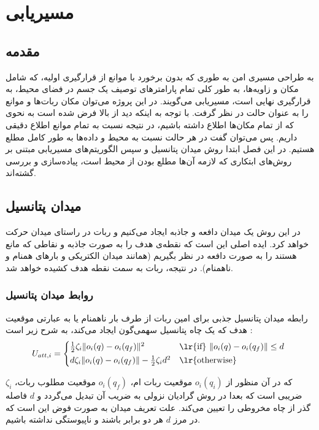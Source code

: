 \chapter{مسیریابی}\label{ch path planning}

\section{مقدمه}

به طراحی مسیری امن به طوری که بدون برخورد با موانع از قرارگیری اولیه، که شامل مکان و زاویه‌ها، به طور کلی تمام پارامترهای توصیف یک جسم در فضای محیط، به قرارگیری نهایی است، مسیریابی می‌گویند. در این پروژه می‌توان مکان ربات‌ها و موانع را به عنوان حالت در نظر گرفت. با توجه به اینکه دید از بالا فرض شده است به نحوی که از تمام مکان‌ها اطلاع داشته باشیم، در نتیجه نسبت به تمام موانع اطلاع دقیقی داریم. پس می‌توان گفت در هر حالت نسبت به محیط و داده‌ها به طور کامل مطلع هستیم. در این فصل ابتدا روش میدان پتانسیل و سپس الگوریتم‌های مسیریابی مبتنی بر روش‌های ابتکاری که لازمه آن‌ها مطلع بودن از محیط است، پیاده‌سازی و بررسی گشته‌اند.

\section{میدان پتانسیل}
در این روش یک میدان دافعه و جاذبه ایجاد می‌کنیم و ربات در راستای میدان حرکت خواهد کرد. ایده اصلی این است که نقطه‌ی هدف را به صورت جاذبه و نقاطی که مانع هستند را به صورت دافعه در نظر بگیریم (همانند میدان الکتریکی و بارهای همنام و ناهمنام). در نتیجه، ربات به سمت نقطه هدف کشیده خواهد شد.

\subsection{روابط میدان پتانسیل}
رابطه میدان پتانسیل جذبی برای امین ربات از طرف بار ناهمنام یا به عبارتی موقعیت هدف که یک چاه پتانسیل سهمی‌گون ایجاد می‌کند، به شرح زیر است \cite{spong2006robot}:
\begin{equation}\label{eq Uatt}
U_{att,i} = 
\begin{cases*}
\frac{1}{2}\zeta_i\|o_i(q) - o_i(q_f)\|^2 & \lr{if} $\|o_i(q) - o_i(q_f)\| \le d$ \\
d\zeta_i\|o_i(q) - o_i(q_f)\|-\frac{1}{2}\zeta_id^2 & \lr{otherwise}
\end{cases*}
\end{equation}

که در آن منظور از $o_i(q_i)$ موقعیت ربات ام، $o_i(q_f)$ موقعیت مطلوب ربات، $\zeta_i$ ضریبی است که بعدا در روش گرادیان نزولی به ضریب آن تبدیل می‌گردد و $d$ فاصله گذر از چاه مخروطی را تعیین می‌کند. علت تعریف میدان به صورت فوض این است که در مرز $d$ هر دو برابر باشند و ناپیوستگی نداشته باشیم.

